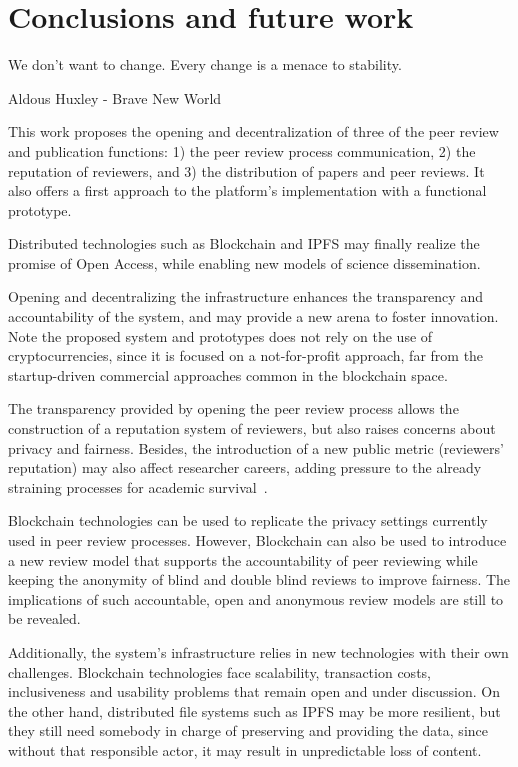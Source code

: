 \chapter{Conclusions and future work}

\begin{FraseCelebre}
  \begin{Frase}
    We don't want to change. Every change is a menace to stability.
  \end{Frase}
  \begin{Fuente}
    Aldous Huxley - Brave New World
  \end{Fuente}
\end{FraseCelebre}

This work proposes the opening and decentralization of three of the peer review
and publication functions: 1) the peer review process communication, 2) the
reputation of reviewers, and 3) the distribution of papers and peer reviews. It
also offers a first approach to the platform's implementation with a functional
prototype.

Distributed technologies such as Blockchain and IPFS may finally realize the
promise of Open Access, while enabling new models of science dissemination.

Opening and decentralizing the infrastructure enhances the transparency and
accountability of the system, and may provide a new arena to foster innovation.
Note the proposed system and prototypes does not rely on the use of
cryptocurrencies, since it is focused on a not-for-profit approach, far from the
startup-driven commercial approaches common in the blockchain space.

The transparency provided by opening the peer review process allows the
construction of a reputation system of reviewers, but also raises concerns about
privacy and fairness. Besides, the introduction of a new public metric
(reviewers' reputation) may also affect researcher careers, adding pressure to
the already straining processes for academic survival~\cite{de2005publish}.

Blockchain technologies can be used to replicate the privacy settings currently
used in peer review processes. However, Blockchain can also be used to introduce
a new review model that supports the accountability of peer reviewing while
keeping the anonymity of blind and double blind reviews to improve fairness. The
implications of such accountable, open and anonymous review models are still to
be revealed.

Additionally, the system's infrastructure relies in new technologies with their
own challenges. Blockchain technologies face scalability, transaction costs,
inclusiveness and usability problems that remain open and under discussion. On
the other hand, distributed file systems such as IPFS may be more resilient, but
they still need somebody in charge of preserving and providing the data, since
without that responsible actor, it may result in unpredictable loss of content.


